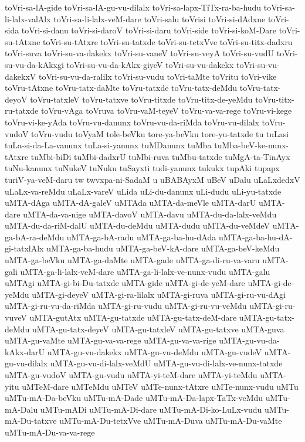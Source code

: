 {toVri-sa-lA-gide
toVri-sa-lA-gu-vu-dilalx
toVri-sa-lapx-TiTx-ra-ba-hudu
toVri-sa-li-lalx-valAlx
toVri-sa-li-lalx-veM-dare
toVri-salu
toVrisi
toVri-si-dAdxne
toVri-sida
toVri-si-danu
toVri-si-daroV
toVri-si-daru
toVri-side
toVri-si-koM-Dare
toVri-su-tAtxne
toVri-su-tAtxre
toVri-su-tatxde
toVri-su-tetxVve
toVri-su-titx-dadxru
toVri-suva
toVri-su-va-dakekx
toVri-su-vaneV
toVri-su-veyA
toVri-su-vudU
toVri-su-vu-da-kAkxgi
toVri-su-vu-da-kAkx-giyeV
toVri-su-vu-dakekx
toVri-su-vu-dakekxV
toVri-su-vu-da-ralilx
toVri-su-vudu
toVri-taMte
toVritu
toVri-vike
toVru-tAtxne
toVru-tatx-daMte
toVru-tatxde
toVru-tatx-deMdu
toVru-tatx-deyoV
toVru-tatxleV
toVru-tatxve
toVru-titxde
toVru-titx-de-yeMdu
toVru-titx-ru-tatxde
toVru-vAga
toVruva
toVru-vaM-teyeV
toVru-va-va-rege
toVru-vi-kege
toVru-vi-ke-yAda
toVru-vu-danunx
toVru-vu-da-riMda
toVru-vu-dilalx
toVru-vudoV
toVru-vudu
toVyaM
tole-beVku
tore-ya-beVku
tore-yu-tatxde
tu
tuLasi
tuLa-si-da-La-vanunx
tuLa-si-yanunx
tuMDanunx
tuMba
tuMba-beV-ke-nunx-tAtxre
tuMbi-biDi
tuMbi-dadxrU
tuMbi-ruva
tuMbu-tatxde
tuMgA-ta-TinAyx
tuNu-kanunx
tuNukeV
tuNuku
tuSayxti
tudi-yanunx
tukukx
tupAki
tupapx
turiV-ya-veM-daru
tw
twvxpa-ni-SadaM
u
uBABAyxM
uBeV
uDalu
uLaLxdedxV
uLaLx-va-reMdu
uLaLx-vareV
uLida
uLi-du-danunx
uLi-dudu
uLi-yu-tatxde
uMTA-dAga
uMTA-dA-galeV
uMTAda
uMTA-da-meVle
uMTA-darU
uMTA-dare
uMTA-da-va-nige
uMTA-davoV
uMTA-davu
uMTA-du-da-lalx-veMdu
uMTA-du-da-riM-dalU
uMTA-du-deMdu
uMTA-dudu
uMTA-du-veMdeV
uMTA-ga-bA-ra-deMdu
uMTA-ga-bA-radu
uMTA-ga-ba-hu-dAda
uMTA-ga-ba-hu-dA-gi-tatxlAlx
uMTA-ga-ba-hudu
uMTA-ga-beV-kA-dare
uMTA-ga-beV-keMdu
uMTA-ga-beVku
uMTA-ga-daMte
uMTA-gade
uMTA-ga-di-ru-va-varu
uMTA-gali
uMTA-ga-li-lalx-veM-dare
uMTA-ga-li-lalx-ve-nunx-vudu
uMTA-galu
uMTAgi
uMTA-gi-bi-Du-tatxde
uMTA-gide
uMTA-gi-de-yeM-dare
uMTA-gi-de-yeMdu
uMTA-gi-deyeV
uMTA-gi-ra-lilalx
uMTA-gi-ruva
uMTA-gi-ru-vu-dAgi
uMTA-gi-ru-vu-da-riMda
uMTA-gi-ru-vudu
uMTA-gi-ru-vu-veMdu
uMTA-gi-ru-vuveV
uMTA-gutAtx
uMTA-gu-tatxde
uMTA-gu-tatx-deM-dare
uMTA-gu-tatx-deMdu
uMTA-gu-tatx-deyeV
uMTA-gu-tatxleV
uMTA-gu-tatxve
uMTA-guva
uMTA-gu-vaMte
uMTA-gu-va-va-rege
uMTA-gu-va-va-rige
uMTA-gu-vu-da-kAkx-darU
uMTA-gu-vu-dakekx
uMTA-gu-vu-deMdu
uMTA-gu-vudeV
uMTA-gu-vu-dilalx
uMTA-gu-vu-di-lalx-veMdU
uMTA-gu-vu-di-lalx-ve-nunx-tatxde
uMTA-gu-vudoV
uMTA-gu-vudu
uMTA-yi-teM-dare
uMTA-yi-teMdu
uMTA-yitu
uMTeM-dare
uMTeMdu
uMTeV
uMTe-nunx-tAtxre
uMTe-nunx-vudu
uMTu
uMTu-mA-Da-beVku
uMTu-mA-Dade
uMTu-mA-Da-lapx-TaTx-veMdu
uMTu-mA-Dalu
uMTu-mADi
uMTu-mA-Di-dare
uMTu-mA-Di-ko-LuLx-vudu
uMTu-mA-Du-tatxve
uMTu-mA-Du-tetxVve
uMTu-mA-Duva
uMTu-mA-Du-vaMte
uMTu-mA-Du-va-va-rege
}
